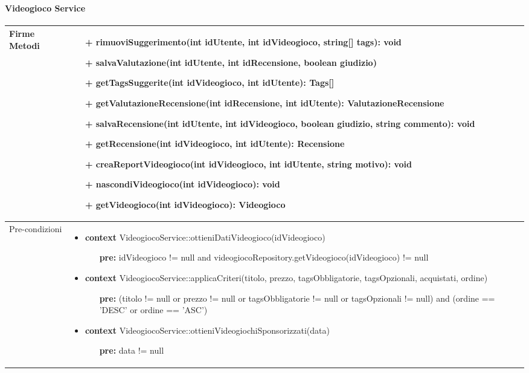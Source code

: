 \paragraph{Videogioco Service}
\small\begin{tabular}{|| l | p{28em} ||} 
	\hline
	Firme Metodi & \begin{itemize}
		\item[+] rimuoviSuggerimento(int idUtente, int idVideogioco, string[] tags): void
		\item[+] salvaValutazione(int idUtente, int idRecensione, boolean giudizio)
		\item[+] getTagsSuggerite(int idVideogioco, int idUtente): Tags[] 
		\item[+] getValutazioneRecensione(int idRecensione, int idUtente): ValutazioneRecensione
		\item[+] salvaRecensione(int idUtente, int idVideogioco, boolean giudizio, string commento): void
		\item[+] getRecensione(int idVideogioco, int idUtente): Recensione
		\item[+] creaReportVideogioco(int idVideogioco, int idUtente, string motivo): void
		\item[+] nascondiVideogioco(int idVideogioco): void
		\item[+] getVideogioco(int idVideogioco): Videogioco  
	\end{itemize}\\
	\hline
	Pre-condizioni & \begin{itemize}[leftmargin=*]
		\item \textbf{context} VideogiocoService::ottieniDatiVideogioco(idVideogioco)
		\begin{itemize}
			\item[ ] \textbf{pre:} idVideogioco != null and videogiocoRepository.getVideogioco(idVideogioco) != null
		\end{itemize}

		\item \textbf{context} VideogiocoService::applicaCriteri(titolo, prezzo, tagsObbligatorie, tagsOpzionali, acquistati, ordine)
		\begin{itemize}
			\item[ ] \textbf{pre:} (titolo != null or prezzo != null or tagsObbligatorie != null or tagsOpzionali != null) and (ordine == 'DESC' or ordine == 'ASC')
		\end{itemize}

		\item \textbf{context} VideogiocoService::ottieniVideogiochiSponsorizzati(data)
		\begin{itemize}
			\item[ ] \textbf{pre:} data != null
		\end{itemize}


\end{itemize}
\end{tabular}
